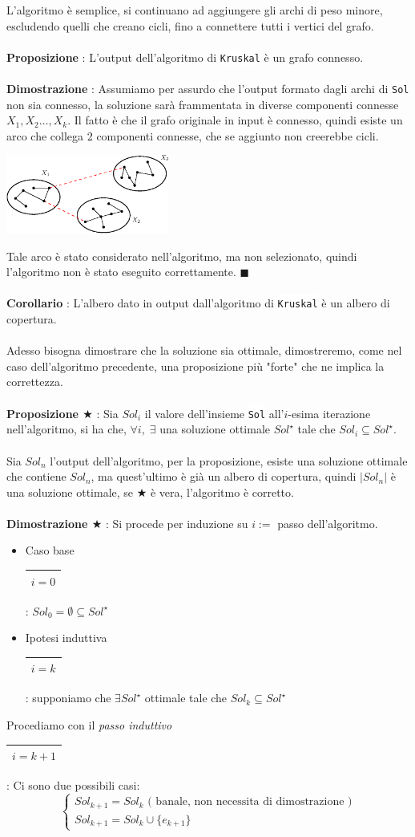 \documentclass[12pt, letterpaper]{article}
\newcommand{\codee}[1]{\colorbox{white}{\texttt{#1}}}
\newcommand{\acc}{\\\hphantom{}\\}
\newcommand{\boxedMath}[1]{\begin{tabular}{|c|}\hline \texttt{#1} \\ \hline\end{tabular} :}
\begin{document}
L'algoritmo è semplice, si continuano ad aggiungere gli archi di peso minore, escludendo quelli che creano cicli, fino
a connettere tutti i vertici del grafo.\acc
\textbf{Proposizione} : L'output dell'algoritmo di \codee{Kruskal} è un grafo connesso.\acc
\textbf{Dimostrazione} : Assumiamo per assurdo che l'output formato dagli archi di \codee{Sol} non sia connesso,
la soluzione sarà frammentata in diverse componenti connesse $X_1,X_2\dots,X_k$. Il fatto è che il grafo originale in input è connesso, quindi
esiste un arco che collega 2 componenti connesse, che se aggiunto non creerebbe cicli.
\begin{center}
    \includegraphics[width=0.4\textwidth ]{images/propMST.eps}
\end{center}
Tale arco è stato considerato nell'algoritmo,
ma non selezionato, quindi l'algoritmo non è stato eseguito correttamente. $\blacksquare$\acc
\textbf{Corollario} : L'albero dato in output dall'algoritmo di  \codee{Kruskal} è un albero di copertura.\acc
Adesso bisogna dimostrare che la soluzione sia ottimale, dimostreremo, come nel caso dell'algoritmo precedente, una proposizione
più "forte" che ne implica la correttezza.\acc
\textbf{Proposizione $\bigstar$} : Sia $Sol_i$ il valore dell'insieme \codee{Sol} all'$i$-esima iterazione nell'algoritmo,
si ha che, $\forall i,\; \exists $ una soluzione ottimale $Sol^\star$ tale che $Sol_i\subseteq Sol^\star$.\acc
Sia $Sol_n$ l'output dell'algoritmo, per la proposizione, esiste una soluzione ottimale che contiene $Sol_n$, ma quest'ultimo
è già un albero di copertura, quindi $|Sol_n|$ è una soluzione ottimale, se $\bigstar$ è vera, l'algoritmo è corretto.\acc
\textbf{Dimostrazione $\bigstar$} :  Si procede per induzione su $i :=$ passo dell'algoritmo.\begin{itemize}
    \item Caso base \boxedMath{$i=0$} $Sol_0 = \emptyset \subseteq Sol^\star$
    \item Ipotesi induttiva  \boxedMath{$i=k$} supponiamo che $\exists Sol^\star$ ottimale tale che $Sol_k\subseteq Sol^\star$
\end{itemize}
Procediamo con il \textit{passo induttivo} \boxedMath{$i=k+1$} Ci sono due possibili casi:
$$\begin{cases}
        Sol_{k+1}=Sol_k \text{ ( banale, non necessita di dimostrazione )} \\
        Sol_{k+1}=Sol_k \cup \{e_{k+1}\}
    \end{cases}$$
\end{document}
